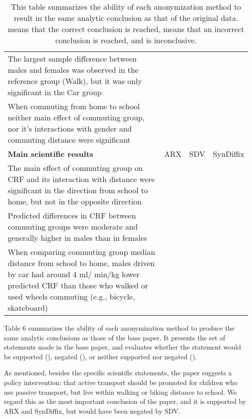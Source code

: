 \documentclass[10pt]{article}
\newcommand{\cmark}{\textcolor{green}{\ding{51}}}  %
\newcommand{\xmark}{\textcolor{red}{\ding{55}}}    %
\newcommand{\omark}{\textcolor{yellow}{\ding{109}}} %
\newcommand{\cmark}{\textbf{O }}
\newcommand{\xmark}{\textbf{X }}
\newcommand{\omark}{? }
\begin{document}
\begin{table}
\begin{center}
\begin{small}
\begin{tabularx}{\textwidth}{Xlll}
The largest sample difference between males and females was observed in the reference group (Walk), but it was only significant in the Car group & \omark & \omark & \omark \\
When commuting from home to school neither main effect of commuting group, nor it’s interactions with
gender and commuting distance were significant & \omark & \cmark & \cmark \\
\midrule
\textbf{Main scientific results}  & ARX & SDV & SynDiffix \\
The main effect of commuting group on CRF and its interaction with distance were significant in the
direction from school to home, but not in the opposite direction & \omark & \xmark & \omark \\
Predicted differences in CRF between commuting groups were moderate and generally higher in males than in females & \cmark & \xmark & \cmark \\
When comparing commuting group median distance from school to home, males driven by car had around 4 ml/
min/kg lower predicted CRF than those who walked or used wheels commuting (e.g., bicycle, skateboard) & \omark & \xmark & \omark \\



\bottomrule
\end{tabularx}
\caption{This table summarizes the ability of each anonymization method to result in the same analytic conclusion as that of the original data. \cmark means that the correct conclusion is reached, \xmark means that an incorrect conclusion is reached, and \omark is inconclusive.}
\label{tab:summary}
\end{small}
\end{center}
\end{table}

Table 6 summarizes the ability of each anonymization method to produce the same analytic conclusions as those of the base paper. It presents the set of statements made in the base paper, and evaluates whether the statement would be supported (\cmark), negated (\xmark), or neither supported nor negated (\omark).

As mentioned, besides the specific scientific statements, the paper suggests a policy intervention: that active transport should be promoted for children who use passive transport, but live within walking or biking distance to school. We regard this as the most important conclusion of the paper, and it is supported by ARX and SynDiffix, but would have been negated by SDV.
\end{document}
